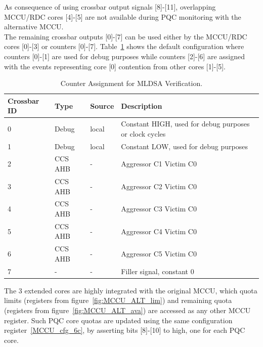 As consequence of using crossbar output signals [8]-[11], overlapping MCCU/RDC cores [4]-[5] are not available during PQC monitoring with the alternative MCCU.\\
The remaining crossbar outputs [0]-[7] can be used either by the MCCU/RDC cores [0]-[3] or counters [0]-[7]. Table~\ref{table:t_ccs} shows the default configuration where counters [0]-[1] are used for debug purposes while counters [2]-[6] are assigned with the events representing core [0] contention from other cores [1]-[5]. \\
\begin{table}[H]
	\caption{Counter Assignment for MLDSA Verification. }
	\label{table:t_ccs}
	\centering
		\begin{tabular}{|l|l|l|l|}
			\hline
			\textbf{Crossbar ID} & \textbf{Type} & \textbf{Source} & \textbf{Description}\\
			\hline

0  & Debug   & local &  Constant HIGH, used for debug purposes or clock cycles \\
1  & Debug   & local &  Constant LOW, used for debug purposes \\
2  & CCS AHB & -     &  Aggressor C1 Victim C0  \\
3  & CCS AHB & -     &  Aggressor C2 Victim C0  \\
4  & CCS AHB & -     &  Aggressor C3 Victim C0  \\
5  & CCS AHB & -     &  Aggressor C4 Victim C0  \\
6  & CCS AHB & -     &  Aggressor C5 Victim C0  \\
7  & -       & -     &  Filler signal, constant 0  \\
	\hline
		\end{tabular}
\end{table}

The 3 extended cores are highly integrated with the original MCCU, which quota limits (registers from figure~\ref{fig:MCCU_ALT_lim}) and remaining quota (registers from figure~\ref{fig:MCCU_ALT_ava}) are accessed as any other MCCU register. Such PQC core quotas are updated using the same configuration register~\ref{MCCU_cfg_6c}, by asserting bits [8]-[10] to high, one for each PQC core.

